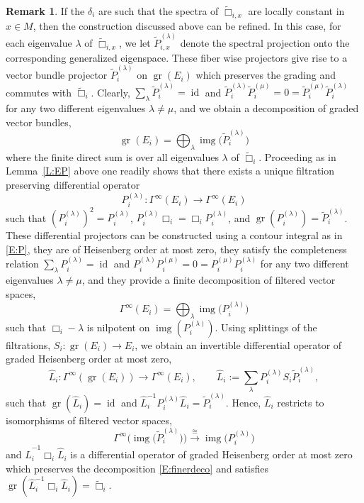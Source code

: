 \documentclass[reqno,12pt]{amsart}
\DeclareMathOperator{\img}{img}
\DeclareMathOperator{\gr}{gr}
\DeclareMathOperator{\id}{id}
\theoremstyle{plain}
\theoremstyle{definition}
\newtheorem{remark}[theorem]{Remark}
\begin{document}
\begin{remark}
If the $\delta_i$ are such that the spectra of $\tilde\Box_{i,x}$ are locally constant in $x\in M$, then the construction discussed above can be refined.
In this case, for each eigenvalue $\lambda$ of $\tilde\Box_{i,x}$, we let $\tilde P^{(\lambda)}_{i,x}$ denote the spectral projection onto the corresponding generalized eigenspace.
These fiber wise projectors give rise to a vector bundle projector $\tilde P^{(\lambda)}_i$ on $\gr(E_i)$ which preserves the grading and commutes with $\tilde\Box_i$.
Clearly, $\sum_\lambda\tilde P^{(\lambda)}_i=\id$ and $\tilde P^{(\lambda)}_i\tilde P^{(\mu)}_i=0=\tilde P^{(\mu)}_i\tilde P^{(\lambda)}_i$ for any two different eigenvalues $\lambda\neq\mu$, and we obtain a decomposition of graded vector bundles,
\begin{equation}\label{E:finerdeco}
\gr(E_i)=\bigoplus_\lambda\img\bigl(\tilde P^{(\lambda)}_i\bigr)
\end{equation}
where the finite direct sum is over all eigenvalues $\lambda$ of $\tilde\Box_i$.
Proceeding as in Lemma~\ref{L:EP} above one readily shows that there exists a unique filtration preserving differential operator 
$$
P^{(\lambda)}_i\colon\Gamma^\infty(E_i)\to\Gamma^\infty(E_i)
$$ 
such that $(P^{(\lambda)}_i)^2=P^{(\lambda)}_i$, $P^{(\lambda)}_i\Box_i=\Box_i P^{(\lambda)}_i$, and $\gr(P^{(\lambda)}_i)=\tilde P^{(\lambda)}_i$.
These differential projectors can be constructed using a contour integral as in \eqref{E:P}, they are of Heisenberg order at most zero, they satisfy the completeness relation $\sum_\lambda P^{(\lambda)}_i=\id$ and $P^{(\lambda)}_iP^{(\mu)}_i=0=P^{(\mu)}_iP^{(\lambda)}_i$ for any two different eigenvalues $\lambda\neq\mu$, and they provide a finite decomposition of filtered vector spaces,
$$
\Gamma^\infty(E_i)=\bigoplus_\lambda\img\bigl(P^{(\lambda)}_i\bigr)
$$
such that $\Box_i-\lambda$ is nilpotent on $\img(P^{(\lambda)}_i)$.
Using splittings of the filtrations, $S_i\colon\gr(E_i)\to E_i$, we obtain an invertible differential operator of graded Heisenberg order at most zero,
$$
\hat L_i\colon\Gamma^\infty(\gr(E_i))\to\Gamma^\infty(E_i),\qquad
\hat L_i:=\sum_\lambda P^{(\lambda)}_iS_i\tilde P^{(\lambda)}_i,
$$
such that $\gr(\hat L_i)=\id$ and $\hat L^{-1}_iP^{(\lambda)}_i\hat L_i=\tilde P^{(\lambda)}_i$.
Hence, $\hat L_i$ restricts to isomorphisms of filtered vector spaces,
$$
\Gamma^\infty\bigl(\img\bigl(\tilde P^{(\lambda)}_i\bigr)\bigr)\xrightarrow\cong\img\bigl(P^{(\lambda)}_i\bigr)
$$
and $\hat L^{-1}_i\Box_i\hat L_i$ is a differential operator of graded Heisenberg order at most zero which preserves the decomposition \eqref{E:finerdeco} and satisfies $\gr(\hat L^{-1}_i\Box_i\hat L_i)=\tilde\Box_i$.

\end{remark}
\end{document}
